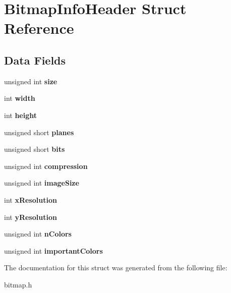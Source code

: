 \hypertarget{struct_bitmap_info_header}{}\section{Bitmap\+Info\+Header Struct Reference}
\label{struct_bitmap_info_header}
\subsection*{Data Fields}
\begin{DoxyCompactItemize}
\item 
\hypertarget{struct_bitmap_info_header_aac913b3a1f6ef005d66bf7a84428773e}{}\label{struct_bitmap_info_header_aac913b3a1f6ef005d66bf7a84428773e} 
unsigned int {\bfseries size}
\item 
\hypertarget{struct_bitmap_info_header_a2474a5474cbff19523a51eb1de01cda4}{}\label{struct_bitmap_info_header_a2474a5474cbff19523a51eb1de01cda4} 
int {\bfseries width}
\item 
\hypertarget{struct_bitmap_info_header_ad12fc34ce789bce6c8a05d8a17138534}{}\label{struct_bitmap_info_header_ad12fc34ce789bce6c8a05d8a17138534} 
int {\bfseries height}
\item 
\hypertarget{struct_bitmap_info_header_a8c89d091e05544a82dc2398eed99634f}{}\label{struct_bitmap_info_header_a8c89d091e05544a82dc2398eed99634f} 
unsigned short {\bfseries planes}
\item 
\hypertarget{struct_bitmap_info_header_a47d1d4d776f8fd3bb0f7dbc3c5aeb534}{}\label{struct_bitmap_info_header_a47d1d4d776f8fd3bb0f7dbc3c5aeb534} 
unsigned short {\bfseries bits}
\item 
\hypertarget{struct_bitmap_info_header_ad180079f62b44e49ec672c9ef6e078b3}{}\label{struct_bitmap_info_header_ad180079f62b44e49ec672c9ef6e078b3} 
unsigned int {\bfseries compression}
\item 
\hypertarget{struct_bitmap_info_header_adcd57a0168319e747bc8099218d3822c}{}\label{struct_bitmap_info_header_adcd57a0168319e747bc8099218d3822c} 
unsigned int {\bfseries image\+Size}
\item 
\hypertarget{struct_bitmap_info_header_ac6eaeb4c0876cf6cd899f41fe3c25ff5}{}\label{struct_bitmap_info_header_ac6eaeb4c0876cf6cd899f41fe3c25ff5} 
int {\bfseries x\+Resolution}
\item 
\hypertarget{struct_bitmap_info_header_aa2f350dd0bda750656d5db5f5e37b2b3}{}\label{struct_bitmap_info_header_aa2f350dd0bda750656d5db5f5e37b2b3} 
int {\bfseries y\+Resolution}
\item 
\hypertarget{struct_bitmap_info_header_aed4506bad904845183194f199f1bdb98}{}\label{struct_bitmap_info_header_aed4506bad904845183194f199f1bdb98} 
unsigned int {\bfseries n\+Colors}
\item 
\hypertarget{struct_bitmap_info_header_a8f7abfbc446b12f385d2b42c3b4fd9b0}{}\label{struct_bitmap_info_header_a8f7abfbc446b12f385d2b42c3b4fd9b0} 
unsigned int {\bfseries important\+Colors}
\end{DoxyCompactItemize}


The documentation for this struct was generated from the following file\+:\begin{DoxyCompactItemize}
\item 
bitmap.\+h\end{DoxyCompactItemize}
